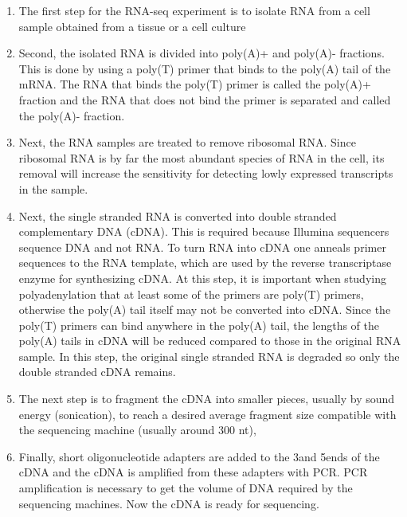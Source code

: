 \begin{enumerate}
	\item The first step for the RNA-seq experiment is to isolate RNA from a
		cell sample obtained from a tissue or a cell culture

	\item Second, the isolated RNA is divided into poly(A)+ and poly(A)-
		fractions. This is done by using a poly(T) primer that binds to the
		poly(A) tail of the mRNA. The RNA that binds the poly(T) primer is
		called the poly(A)+ fraction and the RNA that does not bind the primer
		is separated and called the poly(A)- fraction.

	\item Next, the RNA samples are treated to remove ribosomal RNA. Since
		ribosomal RNA is by far the most abundant species of RNA in the cell,
		its removal will increase the sensitivity for detecting lowly expressed
		transcripts in the sample.

	\item Next, the single stranded RNA is converted into double stranded
        complementary DNA (cDNA). This is required because Illumina sequencers
        sequence DNA and not RNA. To turn RNA into cDNA one anneals primer
        sequences to the RNA template, which are used by the reverse
        transcriptase enzyme for synthesizing cDNA. At this step, it is
        important when studying polyadenylation that at least some of the
        primers are poly(T) primers, otherwise the poly(A) tail itself may not
        be converted into cDNA. Since the poly(T) primers can bind anywhere in
        the poly(A) tail, the lengths of the poly(A) tails in cDNA will be
        reduced compared to those in the original RNA sample. In this step, the
        original single stranded RNA is degraded so only the double stranded
        cDNA remains.

	\item The next step is to fragment the cDNA into smaller pieces, usually by
		sound energy (sonication), to reach a desired average fragment size
		compatible with the sequencing machine (usually around 300 nt),

	\item Finally, short oligonucleotide adapters are added to the 3\ppp and
		5\ppp ends of the cDNA and the cDNA is amplified from these adapters
		with PCR.  PCR amplification is necessary to get the volume of DNA
		required by the sequencing machines. Now the cDNA is ready for
		sequencing.

\end{enumerate}


